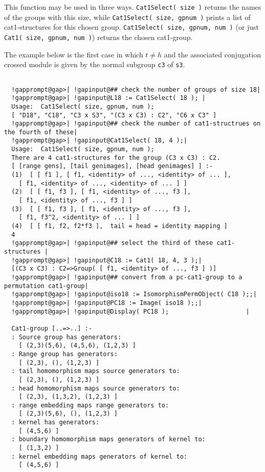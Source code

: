 \documentclass[a4paper,11pt]{report}
\begin{document}
{{{ This function may be used in three ways. \texttt{Cat1Select( size )} returns the names of the groups with this size, while \texttt{Cat1Select( size, gpnum )} prints a list of cat1-structures for this chosen group. \texttt{Cat1Select( size, gpnum, num )} (or just \texttt{Cat1( size, gpnum, num )}) returns the chosen cat1-group. 

 The example below is the first case in which $t \neq h$ and the associated conjugation crossed module is given by the normal subgroup \texttt{c3} of \texttt{s3}. }

 
\begin{Verbatim}[commandchars=!@|,fontsize=\small,frame=single,label=Example]
  
  !gapprompt@gap>| !gapinput@## check the number of groups of size 18|
  !gapprompt@gap>| !gapinput@L18 := Cat1Select( 18 ); |
  Usage:  Cat1Select( size, gpnum, num );
  [ "D18", "C18", "C3 x S3", "(C3 x C3) : C2", "C6 x C3" ]
  !gapprompt@gap>| !gapinput@## check the number of cat1-structrues on the fourth of these|
  !gapprompt@gap>| !gapinput@Cat1Select( 18, 4 );|
  Usage:  Cat1Select( size, gpnum, num );
  There are 4 cat1-structures for the group (C3 x C3) : C2.
  [ [range gens], [tail genimages], [head genimages] ] :-
  (1)  [ [ f1 ], [ f1, <identity> of ..., <identity> of ... ], 
    [ f1, <identity> of ..., <identity> of ... ] ]
  (2)  [ [ f1, f3 ], [ f1, <identity> of ..., f3 ], 
    [ f1, <identity> of ..., f3 ] ]
  (3)  [ [ f1, f3 ], [ f1, <identity> of ..., f3 ], 
    [ f1, f3^2, <identity> of ... ] ]
  (4)  [ [ f1, f2, f2*f3 ],  tail = head = identity mapping ]
  4
  !gapprompt@gap>| !gapinput@## select the third of these cat1-structures |
  !gapprompt@gap>| !gapinput@C18 := Cat1( 18, 4, 3 );|
  [(C3 x C3) : C2=>Group( [ f1, <identity> of ..., f3 ] )]
  !gapprompt@gap>| !gapinput@## convert from a pc-cat1-group to a permutation cat1-group|
  !gapprompt@gap>| !gapinput@iso18 := IsomorphismPermObject( C18 );;|
  !gapprompt@gap>| !gapinput@PC18 := Image( iso18 );;|
  !gapprompt@gap>| !gapinput@Display( PC18 );                     |
  
  Cat1-group [..=>..] :- 
  : Source group has generators:
    [ (2,3)(5,6), (4,5,6), (1,2,3) ]
  : Range group has generators:
    [ (2,3), (), (1,2,3) ]
  : tail homomorphism maps source generators to:
    [ (2,3), (), (1,2,3) ]
  : head homomorphism maps source generators to:
    [ (2,3), (1,3,2), (1,2,3) ]
  : range embedding maps range generators to:
    [ (2,3)(5,6), (), (1,2,3) ]
  : kernel has generators:
    [ (4,5,6) ]
  : boundary homomorphism maps generators of kernel to:
    [ (1,3,2) ]
  : kernel embedding maps generators of kernel to:
    [ (4,5,6) ]
  

\end{Verbatim}}}
\end{document}
